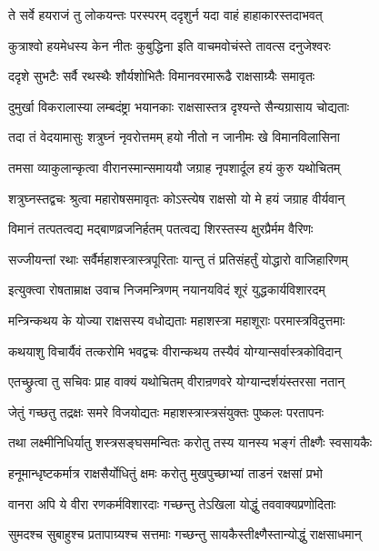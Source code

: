 \twolineshloka
{ते सर्वे हयराजं तु लोकयन्तः परस्परम्}
{ददृशुर्न यदा वाहं हाहाकारस्तदाभवत्}%

\twolineshloka
{कुत्राश्वो हयमेधस्य केन नीतः कुबुद्धिना}
{इति वाचमवोचंस्ते तावत्स दनुजेश्वरः}%

\twolineshloka
{ददृशे सुभटैः सर्वै रथस्थैः शौर्यशोभितैः}
{विमानवरमारूढै राक्षसाग्र्यैः समावृतः}%

\twolineshloka
{दुमुर्खा विकरालास्या लम्बदंष्ट्रा भयानकाः}
{राक्षसास्तत्र दृश्यन्ते सैन्यग्रासाय चोद्यताः}%

\twolineshloka
{तदा तं वेदयामासुः शत्रुघ्नं नृवरोत्तमम्}
{हयो नीतो न जानीमः खे विमानविलासिना}%

\twolineshloka
{तमसा व्याकुलान्कृत्वा वीरानस्मान्समाययौ}
{जग्राह नृपशार्दूल हयं कुरु यथोचितम्}%

\twolineshloka
{शत्रुघ्नस्तद्वचः श्रुत्वा महारोषसमावृतः}
{कोऽस्त्येष राक्षसो यो मे हयं जग्राह वीर्यवान्}%

\twolineshloka
{विमानं तत्पतत्वद्य मद्बाणव्रजनिर्हतम्}
{पतत्वद्य शिरस्तस्य क्षुरप्रैर्मम वैरिणः}%

\twolineshloka
{सज्जीयन्तां रथाः सर्वैर्महाशस्त्रास्त्रपूरिताः}
{यान्तु तं प्रतिसंहर्तुं योद्धारो वाजिहारिणम्}%

\twolineshloka
{इत्युक्त्वा रोषताम्राक्ष उवाच निजमन्त्रिणम्}
{नयानयविदं शूरं युद्धकार्यविशारदम्}%


\twolineshloka
{मन्त्रिन्कथय के योज्या राक्षसस्य वधोद्यताः}
{महाशस्त्रा महाशूराः परमास्त्रविदुत्तमाः}%

\twolineshloka
{कथयाशु विचार्यैवं तत्करोमि भवद्वचः}
{वीरान्कथय तस्यैवं योग्यान्सर्वास्त्रकोविदान्}%

\twolineshloka
{एतच्छ्रुत्वा तु सचिवः प्राह वाक्यं यथोचितम्}
{वीरान्रणवरे योग्यान्दर्शयंस्तरसा नतान्}%


\twolineshloka
{जेतुं गच्छतु तद्रक्षः समरे विजयोद्यतः}
{महाशस्त्रास्त्रसंयुक्तः पुष्कलः परतापनः}%

\twolineshloka
{तथा लक्ष्मीनिधिर्यातु शस्त्रसङ्घसमन्वितः}
{करोतु तस्य यानस्य भङ्गं तीक्ष्णैः स्वसायकैः}%

\twolineshloka
{हनूमान्धृष्टकर्मात्र राक्षसैर्योधितुं क्षमः}
{करोतु मुखपुच्छाभ्यां ताडनं रक्षसां प्रभो}%

\twolineshloka
{वानरा अपि ये वीरा रणकर्मविशारदाः}
{गच्छन्तु तेऽखिला योद्धुं तववाक्यप्रणोदिताः}%

\twolineshloka
{सुमदश्च सुबाहुश्च प्रतापाग्र्यश्च सत्तमाः}
{गच्छन्तु सायकैस्तीक्ष्णैस्तान्योद्धुं राक्षसाधमान्}%

